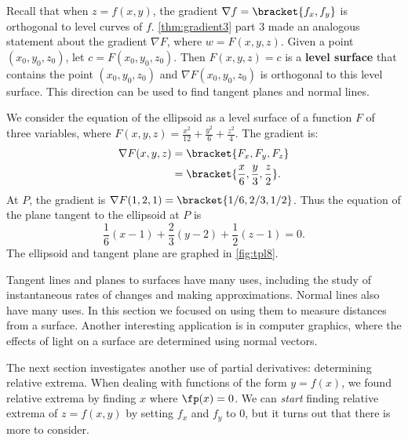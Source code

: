 Recall that when $z=f(x,y)$, the gradient $\nabla f =\bracket{f_x,f_y}$ is orthogonal to level curves of $f$. \autoref{thm:gradient3} part 3 made an analogous statement about the gradient $\nabla F$, where $w= F(x,y,z)$. Given a point $(x_0,y_0,z_0)$, let $c = F(x_0,y_0,z_0)$. Then $F(x,y,z) = c$ is a \textbf{level surface} that contains the point $(x_0,y_0,z_0)$ and %
$\nabla F(x_0,y_0,z_0)$ is orthogonal to this level surface.
%
%
%
This direction can be used to find tangent planes and normal lines.

{We consider the equation of the ellipsoid as a level surface of a function $F$ of three variables, where $F(x,y,z) = \frac{x^2}{12} +\frac{y^2}{6}+\frac{z^2}{4}$.  The gradient is:
\begin{align*}
\nabla F(x,y,z) &=\bracket{F_x, F_y,F_z}\\
			&=\bracket{\frac x6, \frac y3, \frac z2}.
\end{align*}
At  $P$, the gradient is $\nabla F(1,2,1) =\bracket{1/6, 2/3, 1/2}$. Thus the equation of the plane tangent to the ellipsoid at $P$ is
\[\frac 16(x-1) + \frac23(y-2) + \frac 12(z-1) = 0.\]
The ellipsoid and tangent plane are graphed in \autoref{fig:tpl8}.}

Tangent lines and planes to surfaces have many uses, including the study of instantaneous rates of changes and making approximations. Normal lines also have many uses. In this section we focused on using them to measure distances from a surface. Another interesting application is in computer graphics, where the effects of light on a surface are determined using normal vectors.\bigskip

The next section investigates another use of partial derivatives: determining relative extrema. When dealing with functions of the form $y=f(x)$, we found relative extrema  by finding $x$ where $\fp(x) = 0$. We can \textit{start} finding relative extrema of $z=f(x,y)$ by setting $f_x$ and $f_y$ to 0, but it turns out that there is more to consider.

